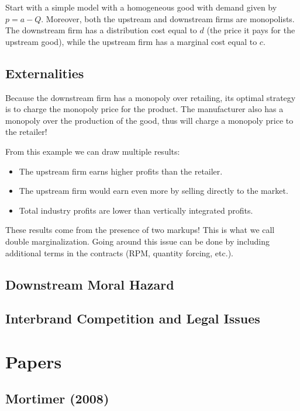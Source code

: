 Start with a simple model with a homogeneous good with demand given by $p = a - Q$. Moreover, both the upstream and downstream firms are monopolists. The downstream firm has a distribution cost equal to $d$ (the price it pays for the upstream good), while the upstream firm has a marginal cost equal to $c$.

\subsection{Externalities}

Because the downstream firm has a monopoly over retailing, its optimal strategy is to charge the monopoly price for the product. The manufacturer also has a monopoly over the production of the good, thus will charge a monopoly price to the retailer! 

From this example we can draw multiple results: \begin{itemize}
\item The upstream firm earns higher profits than the retailer.
\item The upstream firm would earn even more by selling directly to the market.
\item Total industry profits are lower than vertically integrated profits.
\end{itemize}
These results come from the presence of two markups! This is what we call double marginalization. Going around this issue can be done by including additional terms in the contracts (RPM, quantity forcing, etc.).

\subsection{Downstream Moral Hazard}



\subsection{Interbrand Competition and Legal Issues}



\newpage

\section{Papers}

\subsection{Mortimer (2008)}

